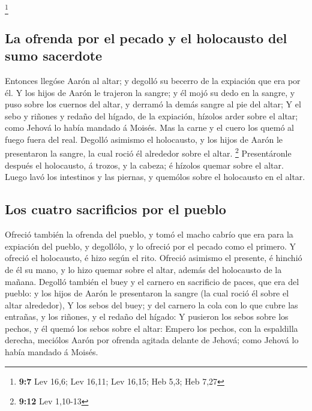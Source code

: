 \footnote{\textbf{9:7} Lev 16,6; Lev 16,11; Lev 16,15; Heb 5,3; Heb 7,27}

\hypertarget{la-ofrenda-por-el-pecado-y-el-holocausto-del-sumo-sacerdote}{%
\subsection{La ofrenda por el pecado y el holocausto del sumo
sacerdote}\label{la-ofrenda-por-el-pecado-y-el-holocausto-del-sumo-sacerdote}}

 Entonces llegóse Aarón al altar; y degolló su becerro de la
expiación que era por él.  Y los hijos de Aarón le trajeron
la sangre; y él mojó su dedo en la sangre, y puso sobre los cuernos del
altar, y derramó la demás sangre al pie del altar;  Y el
sebo y riñones y redaño del hígado, de la expiación, hízolos arder sobre
el altar; como Jehová lo había mandado á Moisés.  Mas la
carne y el cuero los quemó al fuego fuera del real. 
Degolló asimismo el holocausto, y los hijos de Aarón le presentaron la
sangre, la cual roció él alrededor sobre el altar. \footnote{\textbf{9:12}
  Lev 1,10-13}  Presentáronle después el holocausto, á
trozos, y la cabeza; é hízolos quemar sobre el altar. 
Luego lavó los intestinos y las piernas, y quemólos sobre el holocausto
en el altar.

\hypertarget{los-cuatro-sacrificios-por-el-pueblo}{%
\subsection{Los cuatro sacrificios por el
pueblo}\label{los-cuatro-sacrificios-por-el-pueblo}}

 Ofreció también la ofrenda del pueblo, y tomó el macho
cabrío que era para la expiación del pueblo, y degollólo, y lo ofreció
por el pecado como el primero.  Y ofreció el holocausto, é
hizo según el rito.  Ofreció asimismo el presente, é
hinchió de él su mano, y lo hizo quemar sobre el altar, además del
holocausto de la mañana.  Degolló también el buey y el
carnero en sacrificio de paces, que era del pueblo: y los hijos de Aarón
le presentaron la sangre (la cual roció él sobre el altar alrededor),
 Y los sebos del buey; y del carnero la cola con lo que
cubre las entrañas, y los riñones, y el redaño del hígado: 
Y pusieron los sebos sobre los pechos, y él quemó los sebos sobre el
altar:  Empero los pechos, con la espaldilla derecha,
meciólos Aarón por ofrenda agitada delante de Jehová; como Jehová lo
había mandado á Moisés.

